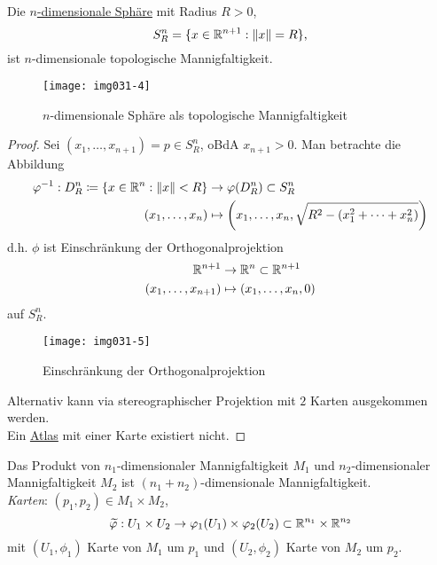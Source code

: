 \begin{example}
\begin{enumerate}
    \begin{minipage}{.45\textwidth}
      \item Die \hyperref[bsp:einheitssphaere]{$ n $-dimensionale Sphäre} mit Radius $ R > 0 $,
      \begin{equation*}
        S^n_R = \{ x \in \mathbb{R}^{n+1} : \Vert x \Vert = R \}\text{,}
      \end{equation*}
      ist $ n $-dimensionale topologische Mannigfaltigkeit.
    \end{minipage}
    \hfill
    \begin{minipage}{.45\textwidth}
      \begin{figure}[H]
        \label{img031-4}
        \texttt{[image: img031-4]}
        \caption{$ n $-dimensionale Sphäre als topologische Mannigfaltigkeit}
      \end{figure}
    \end{minipage}
    \begin{proof}
      Sei $ (x_1, \dots, x_{n+1}) = p \in S^n_R $, oBdA $ x_{n+1} > 0 $. Man betrachte die Abbildung
      \begin{align*}
        \varphi^{-1} : D^n_R \coloneqq \left\{ x \in \mathbb{R}^n : \Vert x \Vert < R \right\} &\to \varphi(D^n_R) \subset S^n_R \\
          (x_1, \dots, x_n) &\mapsto \left(x_1, \dots, x_n, \sqrt{R^2-(x_1^2 + \cdots + x_n^2)}\right)
      \end{align*}
      d.h. $ \phi $ ist Einschränkung der Orthogonalprojektion
      \begin{align*}
        \mathbb{R}^{n+1} &\to \mathbb{R}^n \subset \mathbb{R}^{n+1} \\
          (x_1, \dots, x_{n+1}) &\mapsto (x_1, \dots, x_n, 0)
      \end{align*}
      auf $ S_R^n $.
      \begin{figure}[H]
        \label{img031-5}
        \texttt{[image: img031-5]}
        \caption{Einschränkung der Orthogonalprojektion}
      \end{figure}
      Alternativ kann via stereographischer Projektion mit $ 2 $ Karten ausgekommen werden. \\
      Ein \hyperref[def:atlas]{Atlas} mit einer Karte existiert nicht.
    \end{proof}
    \item Das Produkt von $ n_1 $-dimensionaler Mannigfaltigkeit $ M_1 $ und $ n_2 $-dimensionaler Mannigfaltigkeit $ M_2 $ ist $ (n_1+n_2) $-dimensionale Mannigfaltigkeit. \\
    \emph{Karten}: $ (p_1, p_2) \in M_1 \times M_2 $,
    \begin{equation*}
      \widetilde{\varphi} : U_1 \times U_2 \to \varphi_1(U_1) \times \varphi_2(U_2) \subset \mathbb{R}^{n_1} \times \mathbb{R}^{n_2}
    \end{equation*}
    mit $ (U_1, \phi_1) $ Karte von $ M_1 $ um $ p_1 $ und $ (U_2, \phi_2) $ Karte von $ M_2 $ um $ p_2 $.
  \end{enumerate}
\end{example}

